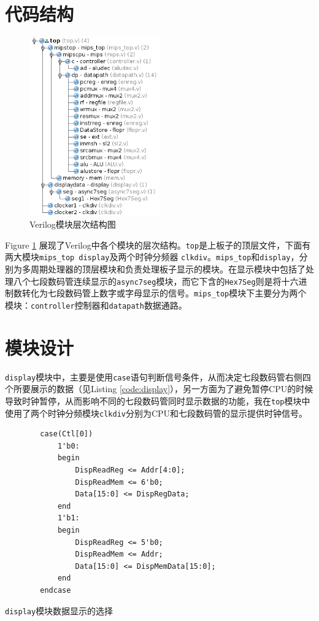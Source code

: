 \documentclass[12pt,a4paper]{article}
\newcommand{\incode}[1]{\texttt{#1}} %
\begin{document}
\section{代码结构}

\begin{figure}[h]
	\centering
	\includegraphics[width=0.5\textwidth]{struct}
	\caption{Verilog模块层次结构图}
	\label{fig:struct}
\end{figure}

Figure \ref{fig:struct} 展现了Verilog中各个模块的层次结构。\incode{top}是上板子的顶层文件，下面有两大模块\incode{mips_top}\ \incode{display}及两个时钟分频器 \incode{clkdiv}。\incode{mips_top}和\incode{display}，分别为多周期处理器的顶层模块和负责处理板子显示的模块。在显示模块中包括了处理八个七段数码管连续显示的\incode{async7seg}模块，而它下含的\incode{Hex7Seg}则是将十六进制数转化为七段数码管上数字或字母显示的信号。\incode{mips_top}模块下主要分为两个模块：\incode{controller}控制器和\incode{datapath}数据通路。

\section{模块设计}

\incode{display}模块中，主要是使用\incode{case}语句判断信号条件，从而决定七段数码管右侧四个所要展示的数据（见Listing \ref{code:display}），另一方面为了避免暂停CPU的时候导致时钟暂停，从而影响不同的七段数码管同时显示数据的功能，我在\incode{top}模块中使用了两个时钟分频模块\incode{clkdiv}分别为CPU和七段数码管的显示提供时钟信号。

\begin{listing}[ht]
	\begin{verbatim}
        case(Ctl[0])
            1'b0:
            begin
                DispReadReg <= Addr[4:0];
                DispReadMem <= 6'b0;
                Data[15:0] <= DispRegData;
            end
            1'b1:
            begin
                DispReadReg <= 5'b0;
                DispReadMem <= Addr;
                Data[15:0] <= DispMemData[15:0];
            end
        endcase
	\end{verbatim}
	\caption{\incode{display}模块数据显示的选择}
	\label{code:display}
\end{listing}
\end{document}

